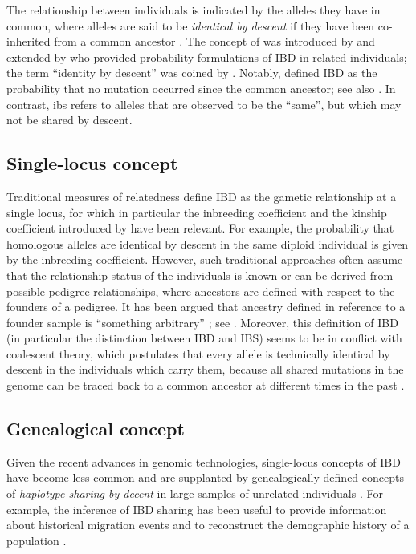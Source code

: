 The relationship between individuals is indicated by the alleles they have in common, where  alleles are said to be \emph{identical by descent} if they have been co-inherited from a common ancestor \citep{Thompson:1974fi,Thompson:1975uu}.
The concept of  was introduced by \citet{cotterman1940calculus} and extended by \citet{malecot1948mathematics} who provided probability formulations of IBD in related individuals; the term ``identity by descent'' was coined by \citet{crow1954}.
Notably, \citet{malecot1948mathematics} defined IBD as the probability that no mutation occurred since the common ancestor; see also \citet{Slatkin:2008by}.
In contrast, \gls{ibs} refers to alleles that are observed to be the ``same'', but which may not be shared by descent.

%
\subsection{Single-locus concept}
%

Traditional measures of relatedness define IBD as the gametic relationship at a single locus, for which in particular the inbreeding coefficient and the kinship coefficient introduced by \citet{Wright:1921tk,Wright:1922cr} have been relevant.
For example, the probability that  homologous alleles are identical by descent in the same diploid individual is given by the inbreeding coefficient.
However, such traditional approaches often assume that the relationship status of the individuals is known or can be derived from possible pedigree relationships, where ancestors are defined with respect to the founders of a pedigree.
It has been argued that ancestry defined in reference to a founder sample is ``something arbitrary'' \citep[][p~141]{maynardsmith1989}; see \citet{Rousset:2002bz}.
Moreover, this definition of IBD (in particular the distinction between IBD and IBS) seems to be in conflict with coalescent theory, which postulates that every allele is technically identical by descent in the individuals which carry them, because all shared mutations in the genome can be traced back to a common ancestor at different times in the past \citep{Powell:2010di}.

%
\subsection{Genealogical concept}
\label{sec:genealogical_ibd}
%

Given the recent advances in genomic technologies, single-locus concepts of IBD have become less common and are supplanted by genealogically defined concepts of \emph{haplotype sharing by decent} in large samples of unrelated individuals \citep{Thompson:2013cj,Wakeley2016book}.
For example, the inference of IBD sharing has been useful to provide information about historical migration events and to reconstruct the demographic history of a population \citep{Palamara:2012cya,Palamara:2013eg,Harris:2013id}.

